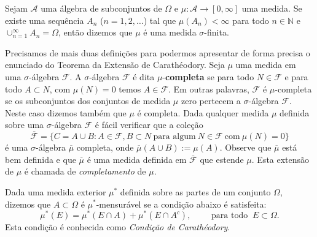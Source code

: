  

\begin{definicao}
	Sejam $\mathcal{A}$ uma álgebra de subconjuntos de $\Omega$ e 
	$\mu:\mathcal{A}\to [0,\infty]$ uma medida.
	Se existe uma sequência $A_n$ ($n=1,2,\ldots$) tal que $\mu(A_n)<\infty$ 
	para todo $n\in\mathbb{N}$ e $\cup_{n=1}^{\infty}A_n =\Omega$, então 
	dizemos que $\mu$ é uma medida $\sigma$-finita.
\end{definicao} 
 
Precisamos de mais duas definições para podermos 
apresentar de forma precisa o enunciado
do Teorema da Extensão de Carathéodory.
Seja $\mu$ uma medida em uma $\sigma$-álgebra $\mathcal{F}$.
A $\sigma$-álgebra $\mathcal{F}$ é dita $\mu$-{\bf completa} 
se para todo $N\in \mathcal{F}$ e para todo $A\subset N$, 
com $\mu(N)=0$ temos $A\in \mathcal{F}$.
Em outras palavras, $\mathcal{F}$ é $\mu$-completa 
se os subconjuntos dos conjuntos de medida $\mu$ zero
pertecem a $\sigma$-álgebra $\mathcal{F}$.
Neste caso dizemos também que $\mu$ é completa.
Dada qualquer medida $\mu$ definida sobre uma 
$\sigma$-álgebra $\mathcal{F}$ é fácil verificar que 
a coleção 
$$
\overline{\mathcal{F}}
=
\{ 	
	C=A\cup B: A\in\mathcal{F}, B\subset N\ \text{para algum}\ N\in\mathcal{F}\ \text{com}\ \mu(N)=0	
\}
$$
é uma $\sigma$-álgebra $\overline{\mu}$ completa, onde $\overline{\mu}(A\cup B):=\mu(A)$.
Observe que $\overline{\mu}$ está bem definida e 
que $\overline{\mu}$ é uma medida definida em $\overline{\mathcal{F}}$ que estende $\mu$.
Esta extensão de $\mu$ é chamada de  
{\it completamento}
de $\mu$.





\begin{definicao}
Dada uma medida exterior $\mu^{*}$ definida sobre as partes de um conjunto $\Omega$,
dizemos que $A\subset \Omega$ é $\mu^{*}$-mensurável se a condição abaixo é satisfeita:
\begin{equation}\label{cond-caratheodory}
\mu^{*}(E) = \mu^*(E\cap A) + \mu^*(E\cap A^c),
\qquad
\text{ para todo } \ E\subset\Omega.
\end{equation}
Esta condição é conhecida 
como {\it Condição de Carathéodory}.
\end{definicao}




